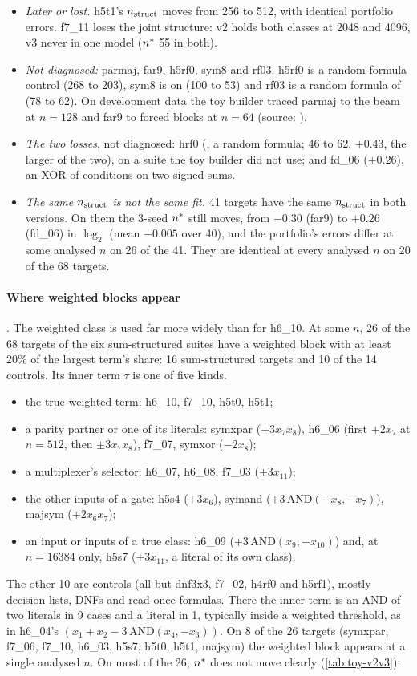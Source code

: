 \begin{itemize}
\item \emph{Later or lost.} h5t1's $n_{\rm struct}$ moves from 256 to 512, with identical portfolio errors. f7\_11 loses the joint structure: v2 holds both classes at 2048 and 4096, v3 never in one model ($n^{*}$ 55 in both).
\item \emph{Not diagnosed:} parmaj, far9, h5rf0, sym8 and rf03. h5rf0 is a random-formula control (268 to 203), sym8 is on  (100 to 53) and rf03 is a random formula of  (78 to 62). On development data the toy builder traced parmaj to the beam at $n=128$ and far9 to forced blocks at $n=64$ (source: ).
\item \emph{The two losses}, not diagnosed: hrf0 (, a random formula; 46 to 62, $+0.43$, the larger of the two), on a suite the toy builder did not use; and fd\_06 ($+0.26$), an XOR of conditions on two signed sums.
\item \emph{The same $n_{\rm struct}$ is not the same fit.} 41 targets have the same $n_{\rm struct}$ in both versions. On them the 3-seed $n^{*}$ still moves, from $-0.30$ (far9) to $+0.26$ (fd\_06) in $\log_2$ (mean $-0.005$ over 40), and the portfolio's errors differ at some analysed $n$ on 26 of the 41. They are identical at every analysed $n$ on 20 of the 68 targets.
\end{itemize}

\paragraph{Where weighted blocks appear} . The weighted class is used far more widely than for h6\_10. At some $n$, 26 of the 68 targets of the six sum-structured suites have a weighted block with at least 20\% of the largest term's share: 16 sum-structured targets and 10 of the 14 controls. Its inner term $\tau$ is one of five kinds.
\begin{itemize}
\item the true weighted term: h6\_10, f7\_10, h5t0, h5t1;
\item a parity partner or one of its literals: symxpar ($+3x_7x_8$), h6\_06 (first $+2x_7$ at $n=512$, then $\pm3x_7x_8$), f7\_07, symxor ($-2x_8$);
\item a multiplexer's selector: h6\_07, h6\_08, f7\_03 ($\pm3x_{11}$);
\item the other inputs of a gate: h5s4 ($+3x_6$), symand ($+3\,\mathrm{AND}(-x_8,-x_7)$), majsym ($+2x_6x_7$);
\item an input or inputs of a true class: h6\_09 ($+3\,\mathrm{AND}(x_9,-x_{10})$) and, at $n=16384$ only, h5s7 ($+3x_{11}$, a literal of its own class).
\end{itemize}
The other 10 are controls (all but dnf3x3, f7\_02, h4rf0 and h5rf1), mostly decision lists, DNFs and read-once formulas. There the inner term is an AND of two literals in 9 cases and a literal in 1, typically inside a weighted threshold, as in h6\_04's $(x_1+x_2-3\,\mathrm{AND}(x_4,-x_3))$. On 8 of the 26 targets (symxpar, f7\_06, f7\_10, h6\_03, h5s7, h5t0, h5t1, majsym) the weighted block appears at a single analysed $n$. On most of the 26, $n^{*}$ does not move clearly (\cref{tab:toy-v2v3}).

